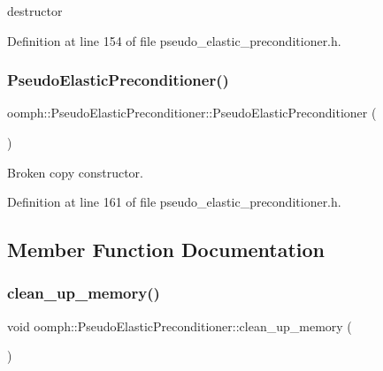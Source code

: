 destructor 



Definition at line 154 of file pseudo\+\_\+elastic\+\_\+preconditioner.\+h.

\mbox{\label{classoomph_1_1PseudoElasticPreconditioner_aaf160121defa770605f1510e222b14bb}} 
\subsubsection{\texorpdfstring{Pseudo\+Elastic\+Preconditioner()}{PseudoElasticPreconditioner()}\hspace{0.1cm}{\footnotesize\ttfamily [2/2]}}
{\footnotesize\ttfamily oomph\+::\+Pseudo\+Elastic\+Preconditioner\+::\+Pseudo\+Elastic\+Preconditioner (\begin{DoxyParamCaption}\item[{const \hyperlink{classoomph_1_1PseudoElasticPreconditioner}{Pseudo\+Elastic\+Preconditioner} \&}]{ }\end{DoxyParamCaption})\hspace{0.3cm}{\ttfamily [inline]}}



Broken copy constructor. 



Definition at line 161 of file pseudo\+\_\+elastic\+\_\+preconditioner.\+h.



\subsection{Member Function Documentation}
\mbox{\label{classoomph_1_1PseudoElasticPreconditioner_adcc9487ec16eea12912b2f3a023b4129}} 
\subsubsection{\texorpdfstring{clean\+\_\+up\+\_\+memory()}{clean\_up\_memory()}}
{\footnotesize\ttfamily void oomph\+::\+Pseudo\+Elastic\+Preconditioner\+::clean\+\_\+up\+\_\+memory (\begin{DoxyParamCaption}{ }\end{DoxyParamCaption})}




